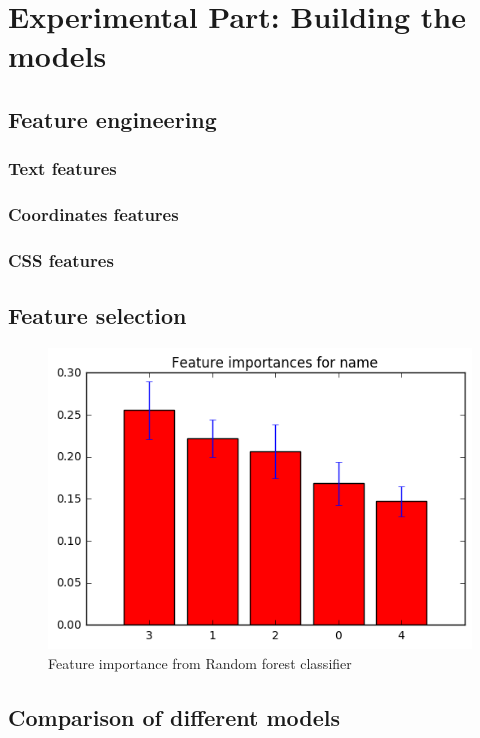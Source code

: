 \chapter{Experimental Part: Building the models}
\section{Feature engineering}
\subsection{Text features}
\subsection{Coordinates features}
\subsection{CSS features}
\section{Feature selection}

\begin{figure}[h]
\begin{center}
\includegraphics[width=14cm]{figures05/feature_importance_names}
\caption{Feature importance from Random forest classifier}
\label{fig:feature_importance}
\end{center}
\end{figure}


\section{Comparison of different models}